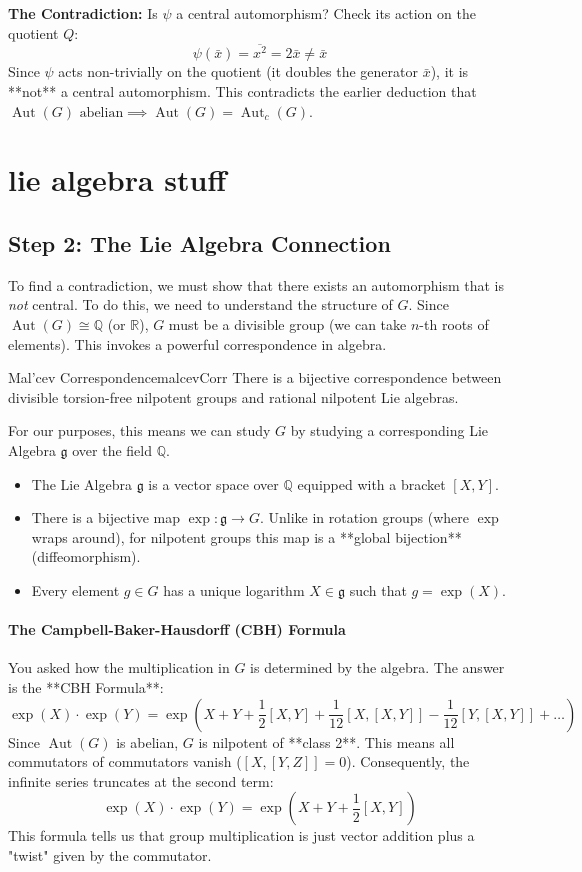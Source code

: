 \documentclass{book}
\newcommand{\Q}{{\mathbb{Q}}}
\newcommand{\R}{{\mathbb{R}}}
\newcommand{\Aut}{{\operatorname{Aut}}}
\begin{document}
\textbf{The Contradiction:}
Is $\psi$ a central automorphism?
Check its action on the quotient $Q$:
\[ \psi(\bar{x}) = \overline{x^2} = 2\bar{x} \neq \bar{x} \]
Since $\psi$ acts non-trivially on the quotient (it doubles the generator $\bar{x}$), it is **not** a central automorphism.
This contradicts the earlier deduction that $\Aut(G) \text{ abelian} \implies \Aut(G) = \Aut_c(G)$.


\chapter{lie algebra stuff}

\section{Step 2: The Lie Algebra Connection}

To find a contradiction, we must show that there exists an automorphism that is \emph{not} central. To do this, we need to understand the structure of $G$.
Since $\Aut(G) \cong \Q$ (or $\R$), $G$ must be a divisible group (we can take $n$-th roots of elements).
This invokes a powerful correspondence in algebra.

\begin{thm}{Mal'cev Correspondence}{malcevCorr}
    There is a bijective correspondence between divisible torsion-free nilpotent groups and rational nilpotent Lie algebras.
\end{thm}

For our purposes, this means we can study $G$ by studying a corresponding Lie Algebra $\mathfrak{g}$ over the field $\Q$.
\begin{itemize}
    \item The Lie Algebra $\mathfrak{g}$ is a vector space over $\Q$ equipped with a bracket $[X, Y]$.
    \item There is a bijective map $\exp: \mathfrak{g} \to G$. Unlike in rotation groups (where $\exp$ wraps around), for nilpotent groups this map is a **global bijection** (diffeomorphism).
    \item Every element $g \in G$ has a unique logarithm $X \in \mathfrak{g}$ such that $g = \exp(X)$.
\end{itemize}

\subsubsection{The Campbell-Baker-Hausdorff (CBH) Formula}
You asked how the multiplication in $G$ is determined by the algebra. The answer is the **CBH Formula**:
\[ \exp(X) \cdot \exp(Y) = \exp\left( X + Y + \frac{1}{2}[X, Y] + \frac{1}{12}[X, [X, Y]] - \frac{1}{12}[Y, [X, Y]] + \dots \right) \]
Since $\Aut(G)$ is abelian, $G$ is nilpotent of **class 2**. This means all commutators of commutators vanish ($[X, [Y, Z]] = 0$).
Consequently, the infinite series truncates at the second term:
\[ \exp(X) \cdot \exp(Y) = \exp\left( X + Y + \frac{1}{2}[X, Y] \right) \]
This formula tells us that group multiplication is just vector addition plus a "twist" given by the commutator.
\end{document}
